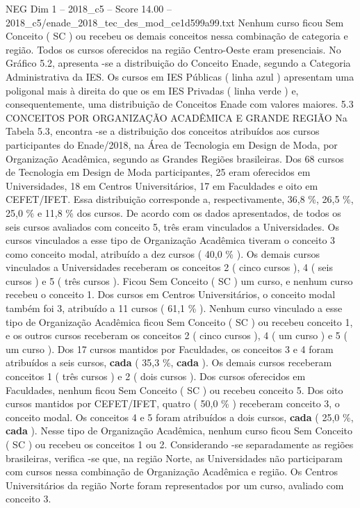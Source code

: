 \begin{textsample}{NEG Dim 1 – 2018\_c5 – Score 14.00 – 2018\_c5/enade\_2018\_tec\_des\_mod\_ce1d599a99.txt}
Nenhum curso ficou Sem Conceito ( SC ) ou recebeu os demais conceitos nessa combinação de categoria e região.
Todos os cursos oferecidos na região Centro-Oeste eram presenciais.
No Gráfico 5.2, apresenta -se a distribuição do Conceito Enade, segundo a Categoria Administrativa da IES.
Os cursos em IES Públicas ( linha azul ) apresentam uma poligonal mais à direita do que os em IES Privadas ( linha verde ) e, consequentemente, uma distribuição de Conceitos Enade com valores maiores. 5.3 CONCEITOS POR ORGANIZAÇÃO ACADÊMICA E GRANDE REGIÃO Na Tabela 5.3, encontra -se a distribuição dos conceitos atribuídos aos cursos participantes do Enade/2018, na Área de Tecnologia em Design de Moda, por Organização Acadêmica, segundo as Grandes Regiões brasileiras.
Dos 68 cursos de Tecnologia em Design de Moda participantes, 25 eram oferecidos em Universidades, 18 em Centros Universitários, 17 em Faculdades e oito em CEFET/IFET.
Essa distribuição corresponde a, respectivamente, 36,8 \%, 26,5 \%, 25,0 \% e 11,8 \% dos cursos.
De acordo com os dados apresentados, de todos os seis cursos avaliados com conceito 5, três eram vinculados a Universidades.
Os cursos vinculados a esse tipo de Organização Acadêmica tiveram o conceito 3 como conceito modal, atribuído a dez cursos ( 40,0 \% ).
Os demais cursos vinculados a Universidades receberam os conceitos 2 ( cinco cursos ), 4 ( seis cursos ) e 5 ( três cursos ).
Ficou Sem Conceito ( SC ) um curso, e nenhum curso recebeu o conceito 1.
Dos cursos em Centros Universitários, o conceito modal também foi 3, atribuído a 11 cursos ( 61,1 \% ).
Nenhum curso vinculado a esse tipo de Organização Acadêmica ficou Sem Conceito ( SC ) ou recebeu conceito 1, e os outros cursos receberam os conceitos 2 ( cinco cursos ), 4 ( um curso ) e 5 ( um curso ).
Dos 17 cursos mantidos por Faculdades, os conceitos 3 e 4 foram atribuídos a seis cursos, \textbf{cada} ( 35,3 \%, \textbf{cada} ).
Os demais cursos receberam conceitos 1 ( três cursos ) e 2 ( dois cursos ).
Dos cursos oferecidos em Faculdades, nenhum ficou Sem Conceito ( SC ) ou recebeu conceito 5.
Dos oito cursos mantidos por CEFET/IFET, quatro ( 50,0 \% ) receberam conceito 3, o conceito modal.
Os conceitos 4 e 5 foram atribuídos a dois cursos, \textbf{cada} ( 25,0 \%, \textbf{cada} ).
Nesse tipo de Organização Acadêmica, nenhum curso ficou Sem Conceito ( SC ) ou recebeu os conceitos 1 ou 2.
Considerando -se separadamente as regiões brasileiras, verifica -se que, na região Norte, as Universidades não participaram com cursos nessa combinação de Organização Acadêmica e região.
Os Centros Universitários da região Norte foram representados por um curso, avaliado com conceito 3.

\end{textsample}

